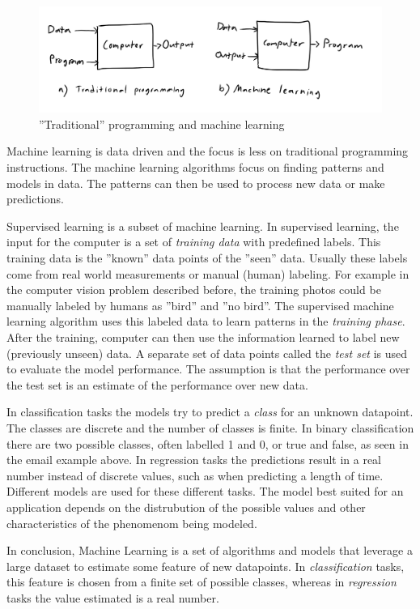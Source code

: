 \begin{figure}[htb]
\centering \includegraphics[width=0.9\linewidth]{gfx/figures/traditionalvsml.png}
\caption{''Traditional'' programming and machine learning}
\label{fig:traditionalvsml}
\end{figure}

Machine learning is data driven and the focus is less on traditional programming instructions.
The machine learning algorithms focus on finding patterns and models in data.
The patterns can then be used to process new data or make predictions.

Supervised learning is a subset of machine learning. In supervised learning, the input for the computer is a set of \textit{training data} with predefined labels. 
This training data is the ''known'' data points of the ''seen'' data.
Usually these labels come from real world measurements or manual (human) labeling.
For example in the computer vision problem described before, the training photos could be manually labeled by humans as ''bird'' and ''no bird''.
The supervised machine learning algorithm uses this labeled data to learn patterns in the \emph{training phase}. After the training, computer can then use the information learned to label new (previously unseen) data.
A separate set of data points called the \emph{test set} is used to evaluate the model performance.
The assumption is that the performance over the test set is an estimate of the performance over new data.

In classification tasks the models try to predict a \emph{class} for an unknown datapoint. The classes are discrete and the number of classes is finite. In binary classification there are two possible classes, often labelled 1 and 0, or true and false, as seen in the email example above. In regression tasks the predictions result in a real number instead of discrete values, such as when predicting a length of time.
Different models are used for these different tasks.
The model best suited for an application depends on the distrubution of the possible values and other characteristics of the phenomenom being modeled.

In conclusion, Machine Learning is a set of algorithms and models that leverage a large dataset to estimate some feature of new datapoints.
In \textit{classification} tasks, this feature is chosen from a finite set of possible classes, whereas in \textit{regression} tasks the value estimated is a real number.


